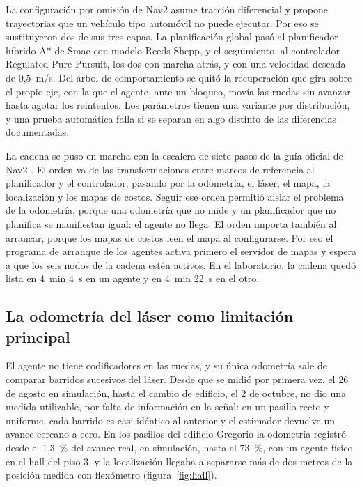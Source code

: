 La configuración por omisión de Nav2 asume tracción diferencial y propone
trayectorias que un vehículo tipo automóvil no puede ejecutar. Por eso se sustituyeron dos de sus tres capas. La
planificación global pasó al planificador híbrido A* de Smac con modelo
Reeds-Shepp, y el seguimiento, al controlador Regulated Pure Pursuit, los
dos con marcha atrás, y con una velocidad deseada de 0,5~m/s. Del árbol de
comportamiento se quitó la recuperación que gira sobre el propio eje, con la que
el agente, ante un bloqueo, movía las ruedas sin avanzar hasta agotar los
reintentos. Los parámetros tienen una variante por distribución, y una prueba
automática falla si se separan en algo distinto de las diferencias documentadas.

La cadena se puso en marcha con la escalera de siete pasos de la guía oficial de
Nav2 \autocite{nav2setup}. El orden va de las transformaciones entre marcos de referencia al
planificador y el controlador, pasando por la odometría, el láser, el mapa, la
localización y los mapas de costos. Seguir ese orden permitió aislar el problema de la odometría, porque una odometría que no mide y un planificador que no
planifica se manifiestan igual: el agente no llega. El orden importa también al
arrancar, porque los mapas de costos leen el mapa al configurarse. Por eso el
programa de arranque de los agentes activa primero el servidor de mapas y
espera a que los seis nodos de la cadena estén activos. En el laboratorio, la
cadena quedó lista en 4~min 4~s en un agente y en 4~min 22~s en el otro.

\subsection{La odometría del láser como limitación principal}
\label{sec:odometria-laser}

El agente no tiene codificadores en las ruedas, y su única odometría sale de
comparar barridos sucesivos del láser. Desde que se midió por primera vez, el 26 de agosto en simulación, hasta el cambio de edificio, el 2 de octubre, no dio una medida utilizable, por falta de información en la señal: en un pasillo recto y uniforme, cada barrido es casi idéntico al anterior y el estimador devuelve un avance cercano a cero. En los pasillos del edificio Gregorio la odometría registró desde el 1,3~\% del avance real, en simulación, hasta el 73~\%, con un agente físico en el hall del piso 3, y la localización llegaba a separarse más de dos metros de la
posición medida con flexómetro (figura~\ref{fig:hall}).


